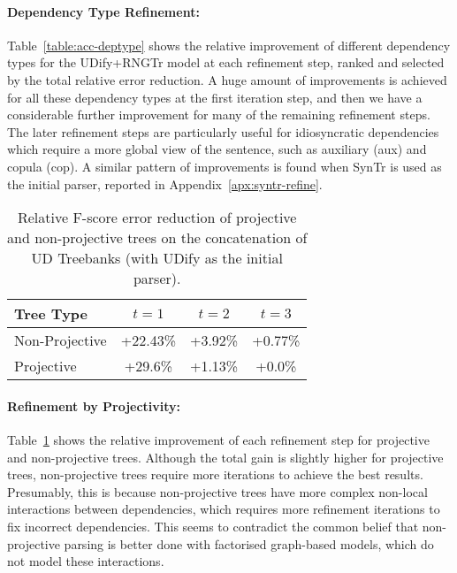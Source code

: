 \paragraph{Dependency Type Refinement:}
Table~\ref{table:acc-deptype} shows the relative improvement of different dependency types for the UDify+RNGTr model at each refinement step, ranked and selected by the total relative error reduction.
A huge amount of improvements is achieved for all these dependency types at the first iteration step, and then we have a considerable further improvement for many of the remaining refinement steps.
The later refinement steps are particularly useful for idiosyncratic dependencies which require a more global view of the sentence, such as auxiliary (aux) and copula (cop).
A similar pattern of improvements is found when SynTr is used as the initial parser, reported in Appendix~\ref{apx:syntr-refine}.


\begin{table}
\centering
  \begin{adjustbox}{width=\linewidth}
    \begin{tabular}{|l|c|c|c|}
    \hline
    Tree Type & $t=1$ & $t=2$ & $t=3$ \\
    \hline
    Non-Projective & +22.43\% & +3.92\% & +0.77\% \\
    Projective & +29.6\% & +1.13\% & +0.0\% \\
    \hline
    \end{tabular}
  \end{adjustbox}
\caption{Relative F-score error reduction of projective and non-projective trees on the concatenation of UD Treebanks (with UDify as the initial parser).
}
\label{table:pr-non-proj}
\end{table}

\paragraph{Refinement by Projectivity:}
Table~\ref{table:pr-non-proj} shows the relative improvement of each refinement step for projective and non-projective trees.  Although the total gain is slightly higher for projective trees, non-projective trees require more iterations to achieve the best results.  Presumably, this is because non-projective trees have more complex non-local interactions between dependencies, which requires more refinement iterations to fix incorrect dependencies.  This seems to contradict the common belief that non-projective parsing is better done with factorised graph-based models, which do not model these interactions.
